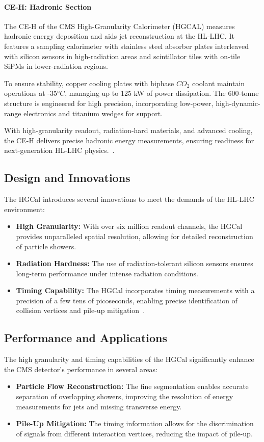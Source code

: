 \paragraph{CE-H: Hadronic Section}
The CE-H of the CMS High-Granularity Calorimeter (HGCAL) measures hadronic energy deposition and aids jet reconstruction at the HL-LHC. It features a sampling calorimeter with stainless steel absorber plates interleaved with silicon sensors in high-radiation areas and scintillator tiles with on-tile SiPMs in lower-radiation regions.

To ensure stability, copper cooling plates with biphase $CO_2$ coolant maintain operations at -35$°C$, managing up to 125 kW of power dissipation. The 600-tonne structure is engineered for high precision, incorporating low-power, high-dynamic-range electronics and titanium wedges for support.

With high-granularity readout, radiation-hard materials, and advanced cooling, the CE-H delivers precise hadronic energy measurements, ensuring readiness for next-generation HL-LHC physics.~\cite{CEH}.

\subsection{Design and Innovations}

The HGCal introduces several innovations to meet the demands of the HL-LHC environment:
\begin{itemize}
    \item \textbf{High Granularity:} With over six million readout channels, the HGCal provides unparalleled spatial resolution, allowing for detailed reconstruction of particle showers.
    \item \textbf{Radiation Hardness:} The use of radiation-tolerant silicon sensors ensures long-term performance under intense radiation conditions.
    \item \textbf{Timing Capability:} The HGCal incorporates timing measurements with a precision of a few tens of picoseconds, enabling precise identification of collision vertices and pile-up mitigation~\cite{hgcal_tdr}.
\end{itemize}

\subsection{Performance and Applications}

The high granularity and timing capabilities of the HGCal significantly enhance the CMS detector's performance in several areas:
\begin{itemize}
    \item \textbf{Particle Flow Reconstruction:} The fine segmentation enables accurate separation of overlapping showers, improving the resolution of energy measurements for jets and missing transverse energy.
    \item \textbf{Pile-Up Mitigation:} The timing information allows for the discrimination of signals from different interaction vertices, reducing the impact of pile-up.
\end{itemize}

